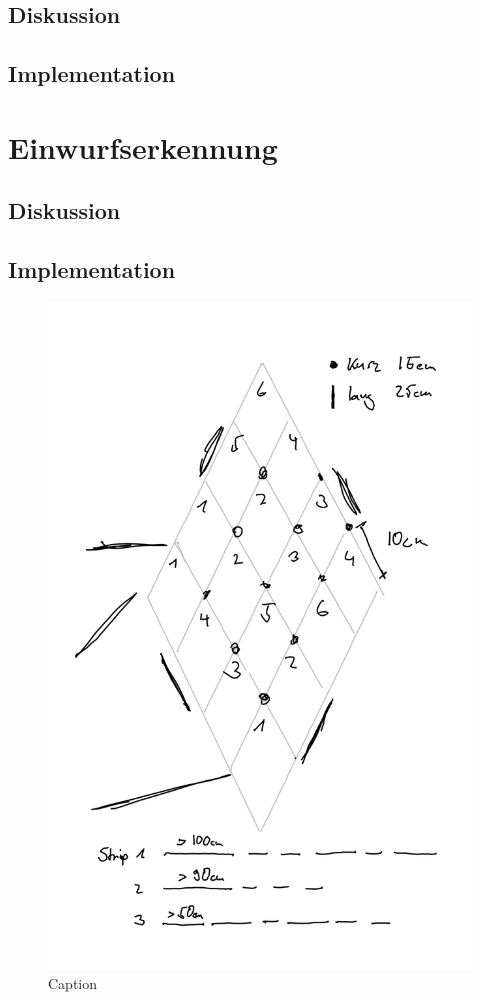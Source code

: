     \subsection{Diskussion}

    \subsection{Implementation}

\section{Einwurfserkennung}
    \subsection{Diskussion}

    \subsection{Implementation}
        
        \begin{figure}[h]
            \begin{center}
                \includegraphics[width=12cm]{sketches/leds_3.png}
            \end{center}
            \caption{Caption}
            \label{fig:leds_3}
        \end{figure}

